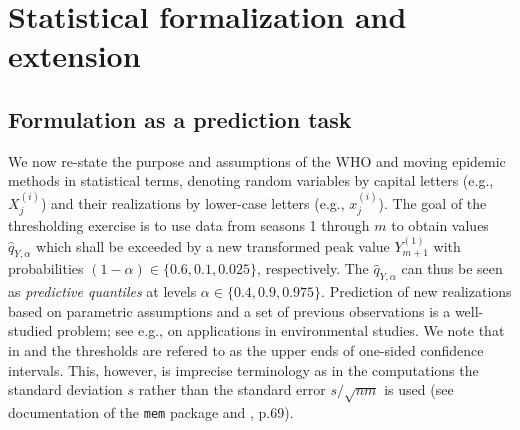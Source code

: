 \documentclass[12pt]{article}
\newcommand{\sd}{s}
\begin{document}
\section{Statistical formalization and extension}
\label{sec:formalization_extension}

\subsection{Formulation as a prediction task}
\label{subsec:reformulation}

We now re-state the purpose and assumptions of the WHO and moving epidemic methods in statistical terms, denoting random variables by capital letters (e.g., $X_j^{(i)}$) and their realizations by lower-case letters (e.g., $x_j^{(i)}$). The goal of the thresholding exercise is to use data from seasons 1 through $m$ to obtain values $\hat{q}_{Y, \alpha}$ which shall be exceeded by a new transformed peak value $Y_{m + 1}^{(1)}$ with probabilities $(1 - \alpha) \in \{0.6, 0.1, 0.025\}$, respectively. The $\hat{q}_{Y, \alpha}$ can thus be seen as \textit{predictive quantiles} at levels $\alpha \in \{0.4, 0.9, 0.975\}$. Prediction of new realizations based on parametric assumptions and a set of previous observations is a well-studied problem; see e.g., \cite{Millard2013} on applications in environmental studies. We note that in \cite{WHO2014} and \cite{Vega2015} the thresholds are refered to as the upper ends of one-sided confidence intervals. This, however, is imprecise terminology as in the computations the standard deviation $\sd$ rather than the standard error $\sd/\sqrt{nm}$ is used (see documentation of the \texttt{mem} package and \citealt{WHO2014}, p.69).
\end{document}
